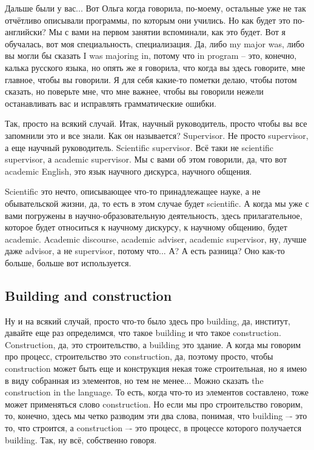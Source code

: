 \documentclass[main.tex]{subfiles}
\begin{document}
Дальше были у вас...
Вот Ольга когда говорила, по-моему, остальные уже не так отчётливо описывали программы, по которым они учились.
Но как будет это по-английски?
Мы с вами на первом занятии вспоминали, как это будет.
Вот я обучалась, вот моя специальность, специализация.
Да, либо my major was, либо вы могли бы сказать I was majoring in, потому что in program -- это, конечно, калька русского языка, но опять же я говорила, что когда вы здесь говорите, мне главное, чтобы вы говорили.
Я для себя какие-то пометки делаю, чтобы потом сказать, но поверьте мне, что мне важнее, чтобы вы говорили нежели останавливать вас и исправлять грамматические ошибки.

Так, просто на всякий случай.
Итак, научный руководитель, просто чтобы вы все запомнили это и все знали.
Как он называется? Supervisor.
Не просто supervisor, а еще научный руководитель.
Scientific supervisor.
Всё таки не scientific supervisor, а academic supervisor.
Мы с вами об этом говорили, да, что вот academic English, это язык научного дискурса, научного общения.

Scientific это нечто, описывающее что-то принадлежащее науке, а не обывательской жизни, да, то есть в этом случае будет scientific.
А когда мы уже с вами погружены в научно-образовательную деятельность, здесь прилагательное, которое будет относиться к научному дискурсу, к научному общению, будет academic.
Academic discourse, academic adviser, academic supervisor, ну, лучше даже advisor, а не supervisor, потому что...
А? А есть разница? Оно как-то больше, больше вот используется.

\subsection{Building and construction}

Ну и на всякий случай, просто что-то было здесь про building, да, институт, давайте еще раз определимся, что такое building и что такое construction.
Construction, да, это строительство, а building это здание.
А когда мы говорим про процесс, строительство это construction, да, поэтому просто, чтобы construction может быть еще и конструкция некая тоже строительная, но я имею в виду собранная из элементов, но тем не менее...
Можно сказать the construction in the language.
То есть, когда что-то из элементов составлено, тоже может применяться слово construction.
Но если мы про строительство говорим, то, конечно, здесь мы четко разводим эти два слова, понимая, что building –- это то, что строится, а construction –- это процесс, в процессе которого получается building.
Так, ну всё, собственно говоря.
\end{document}
